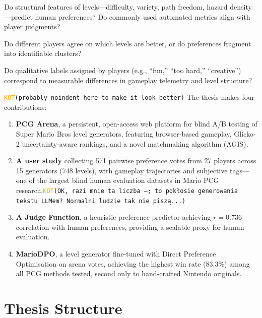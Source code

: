 \documentclass[shortabstract, mgr, english]{iithesis}
\newcommand{\DEBUG}[1]{{#1}} %
\newcommand{\KOT}[1]{\DEBUG{\tt{\textcolor{orange}{KOT}(}{#1}{)}}}
\begin{document}
\begin{description}[style=nextline]
    \item[RQ1: What makes a good level?] Do structural features of
    levels---difficulty, variety, path freedom, hazard density---predict human
    preferences? Do commonly used automated metrics align with player judgments?
    \item[RQ2: Are player preferences consistent?] Do different players agree on
    which levels are better, or do preferences fragment into identifiable
    clusters?
    \item[RQ3: Do subjective tags have measurable correlates?] Do qualitative
    labels assigned by players (e.g., ``fun,'' ``too hard,'' ``creative'')
    correspond to measurable differences in gameplay telemetry and level
    structure?
\end{description}

\KOT{probably noindent here to make it look better}
The thesis makes four contributions: 

\begin{enumerate}
    \item \textbf{PCG Arena}, a persistent, open-access web platform for blind
          A/B testing of Super Mario Bros level generators, featuring
          browser-based gameplay, Glicko-2 uncertainty-aware rankings, and a
          novel matchmaking algorithm (AGIS).
    \item \textbf{A user study} collecting 571 pairwise preference votes from 27
          players across 15 generators (748 levels), with gameplay trajectories
          and subjective tags---one of the largest blind human evaluation
          datasets in Mario PCG research.\KOT{OK, razi mnie ta liczba ---; to pokłosie generowania tekstu LLMem? Normalni ludzie tak nie piszą...}
    \item \textbf{A Judge Function}, a heuristic preference predictor achieving
          $r = 0.736$ correlation with human preferences, providing a scalable
          proxy for human evaluation.
    \item \textbf{MarioDPO}, a level generator fine-tuned with Direct Preference
          Optimisation on arena votes, achieving the highest win rate (83.3\%)
          among all PCG methods tested, second only to hand-crafted Nintendo
          originals.
\end{enumerate}

\section{Thesis Structure}
\label{sec:intro-structure}
\end{document}
